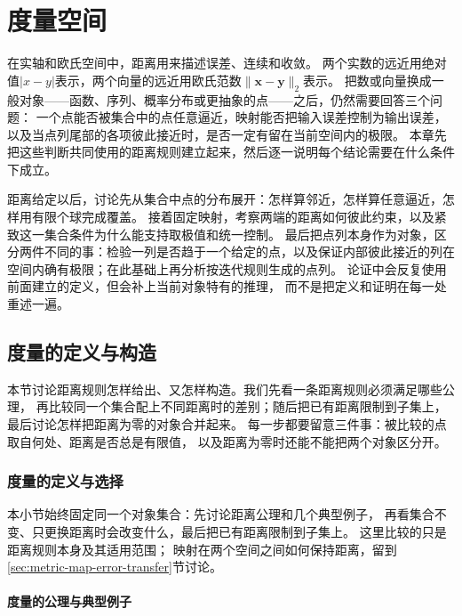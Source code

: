 \chapter{度量空间}
\label{chap:metric-spaces}

在实轴和欧氏空间中，距离用来描述误差、连续和收敛。
两个实数的远近用绝对值$|x-y|$表示，两个向量的远近用欧氏范数$\lVert\bm{x}-\bm{y}\rVert_2$表示。
把数或向量换成一般对象——函数、序列、概率分布或更抽象的点——之后，仍然需要回答三个问题：
一个点能否被集合中的点任意逼近，映射能否把输入误差控制为输出误差，
以及当点列尾部的各项彼此接近时，是否一定有留在当前空间内的极限。
本章先把这些判断共同使用的距离规则建立起来，然后逐一说明每个结论需要在什么条件下成立。

距离给定以后，讨论先从集合中点的分布展开：怎样算邻近，怎样算任意逼近，怎样用有限个球完成覆盖。
接着固定映射，考察两端的距离如何彼此约束，以及紧致这一集合条件为什么能支持取极值和统一控制。
最后把点列本身作为对象，区分两件不同的事：检验一列是否趋于一个给定的点，以及保证内部彼此接近的列在空间内确有极限；在此基础上再分析按迭代规则生成的点列。
论证中会反复使用前面建立的定义，但会补上当前对象特有的推理，
而不是把定义和证明在每一处重述一遍。

\section{度量的定义与构造}
\label{sec:metric-distance-rules}

本节讨论距离规则怎样给出、又怎样构造。我们先看一条距离规则必须满足哪些公理，
再比较同一个集合配上不同距离时的差别；随后把已有距离限制到子集上，最后讨论怎样把距离为零的对象合并起来。
每一步都要留意三件事：被比较的点取自何处、距离是否总是有限值，
以及距离为零时还能不能把两个对象区分开。

\subsection{度量的定义与选择}
\label{sec:metric-distance-choice}

本小节始终固定同一个对象集合：先讨论距离公理和几个典型例子，
再看集合不变、只更换距离时会改变什么，最后把已有距离限制到子集上。
这里比较的只是距离规则本身及其适用范围；
映射在两个空间之间如何保持距离，留到\ref{sec:metric-map-error-transfer}节讨论。

\subsubsection{度量的公理与典型例子}
\label{sec:metric-distance-axioms}


